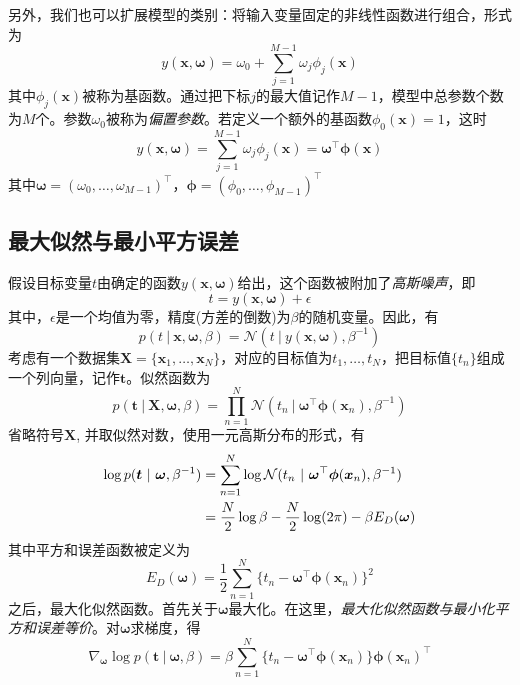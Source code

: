 \documentclass[11pt]{ctexbook}
\begin{document}
另外，我们也可以扩展模型的类别：将输入变量固定的非线性函数进行组合，形式为
\begin{equation}
	y(\bm x,\bm \omega) = \omega_0 + \sum_{j=1}^{M-1}\omega_j\phi_j(\bm x)
\end{equation}
其中$\phi_j(\bm x)$被称为基函数。通过把下标$j$的最大值记作$M-1$，模型中总参数个数为$M$个。参数$\omega_0$被称为\emph{偏置参数}。若定义一个额外的基函数$\phi_0(\bm x)=1$，这时
\begin{equation}
	y(\bm x, \bm \omega) = \sum_{j=1}^{M-1}\omega_j\phi_j(\bm x) = \bm \omega^\top\bm \phi(\bm x)
\end{equation}
其中$\bm\omega=(\omega_0, \ldots, \omega_{M-1})^\top$，$\bm \phi =(\phi_0, \ldots, \phi_{M-1})^\top$
\subsection{最大似然与最小平方误差}
假设目标变量$t$由确定的函数$y(\bm x, \bm\omega)$给出，这个函数被附加了\emph{高斯噪声}，即
\begin{equation}
	t = y(\bm x, \bm \omega) + \epsilon
\end{equation}
其中，$\epsilon$是一个均值为零，精度(方差的倒数)为$\beta$的随机变量。因此，有
\begin{equation}
	p(t\ |\ \bm x,\bm \omega, \beta) = \mathcal N(t\ |\ y(\bm x, \bm \omega), \beta^{-1})
\end{equation}
考虑有一个数据集$\bm X = \{\bm x_1, \ldots, \bm x_N\}$，对应的目标值为$t_1, \ldots, t_N$，把目标值$\{t_n\}$组成一个列向量，记作$\bm t$。似然函数为
\begin{equation}
	p(\bm t\ |\ \bm X, \bm \omega, \beta) = \prod_{n=1}^{N}\mathcal N(t_n\ |\ \bm\omega^\top\bm\phi(\bm x_n), \beta^{-1})
\end{equation}
省略符号$\bm X$, 并取似然对数，使用一元高斯分布的形式，有
\begin{align}
	\log p(\bm t\ |\ \bm\omega, \beta^{-1}) &= \sum_{n=1}^{N}\log\mathcal N(t_n\ |\ \bm\omega^\top\bm\phi(\bm x_n), \beta^{-1}) \notag \\
	&= \frac{N}{2}\log\beta - \frac{N}{2}\log(2\pi)-\beta E_D(\bm \omega)
\end{align}
其中平方和误差函数被定义为
\begin{equation}
	E_D(\bm \omega) = \frac{1}{2}\sum_{n=1}^{N}\{t_n-\bm\omega^\top\bm\phi(\bm x_n) \}^2
\end{equation}
之后，最大化似然函数。首先关于$\bm \omega$最大化。在这里，\emph{最大化似然函数与最小化平方和误差等价}。对$\bm \omega$求梯度，得
\begin{equation}
	\nabla_{\bm\omega}\log p(\bm t\ |\ \bm\omega, \beta) = \beta\sum_{n=1}^{N}\{t_n-\bm\omega^\top\bm\phi(\bm x_n)\}\bm\phi(\bm x_n)^\top
\end{equation}
\end{document}
